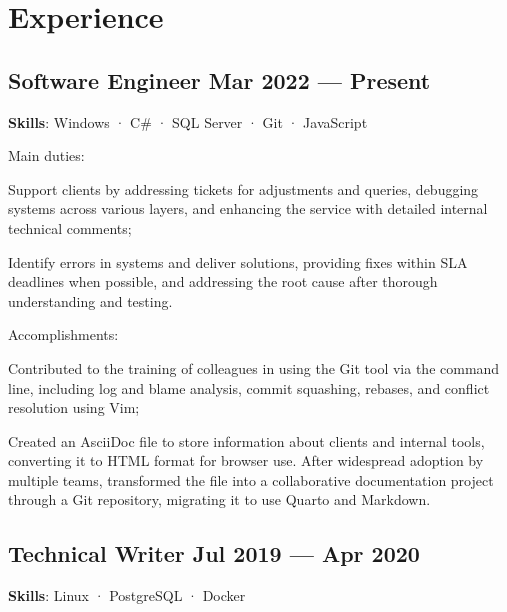 \def\blog{https://severalnines.com/blog}

\section{Experience}

\subsection{Software Engineer \hfill Mar 2022 --- Present}
\vspace{.8em}
\textbf{Skills}: Windows · C\# · SQL Server · Git · JavaScript


\vspace{.3em}
Main duties:
\vspace{-.5em}
\begin{zitemize}
  \item
    Support clients by addressing tickets for adjustments and queries, debugging systems across various layers, and enhancing the service with detailed internal technical comments;
  \item
    Identify errors in systems and deliver solutions, providing fixes within SLA deadlines when possible, and addressing the root cause after thorough understanding and testing.
\end{zitemize}

Accomplishments:
\vspace{-.5em}
\begin{zitemize}
  \item
    Contributed to the training of colleagues in using the Git tool via the command line, including log and blame analysis, commit squashing, rebases, and conflict resolution using Vim;
  \item
    Created an AsciiDoc file to store information about clients and internal tools, converting it to HTML format for browser use. After widespread adoption by multiple teams, transformed the file into a collaborative documentation project through a Git repository, migrating it to use Quarto and Markdown.
\end{zitemize}


\vspace{.5em}
\subsection{Technical Writer \hfill Jul 2019 --- Apr 2020}
\vspace{.8em}
\textbf{Skills}: Linux · PostgreSQL · Docker



